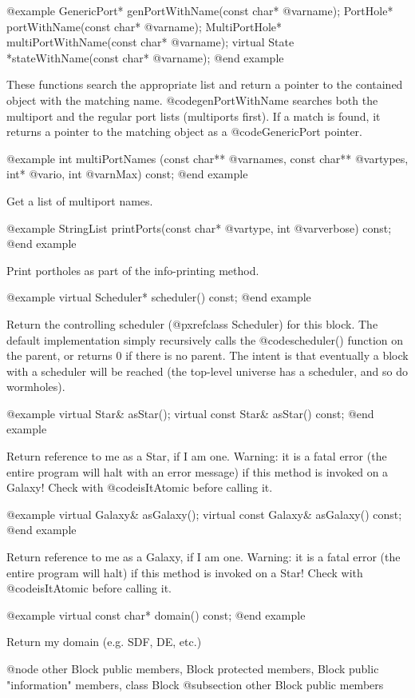 @example
GenericPort* genPortWithName(const char* @var{name});
PortHole* portWithName(const char* @var{name});
MultiPortHole* multiPortWithName(const char* @var{name});
virtual State *stateWithName(const char* @var{name});
@end example

These functions search the appropriate list and return a pointer
to the contained object with the matching name.  @code{genPortWithName}
searches both the multiport and the regular port lists (multiports
first).  If a match is found, it returns a pointer to the matching
object as a @code{GenericPort} pointer.

@example
int multiPortNames (const char** @var{names}, const char** @var{types},
                    int* @var{io}, int @var{nMax}) const;
@end example

Get a list of multiport names.

@example
StringList printPorts(const char* @var{type}, int @var{verbose}) const;
@end example

Print portholes as part of the info-printing method.

@example
virtual Scheduler* scheduler() const;
@end example

Return the controlling scheduler (@pxref{class Scheduler})
for this block.  The default
implementation simply recursively calls the @code{scheduler()} function on the parent, or returns 0
if there is no parent.  The intent is that eventually a block with
a scheduler will be reached (the top-level universe has a scheduler,
and so do wormholes).

@example
virtual Star& asStar();
virtual const Star& asStar() const;
@end example

Return reference to me as a Star, if I am one.  Warning: it is a
fatal error (the entire program will halt with an error message)
if this method is invoked on a Galaxy!  Check with @code{isItAtomic}
before calling it.

@example
virtual Galaxy& asGalaxy();
virtual const Galaxy& asGalaxy() const;
@end example

Return reference to me as a Galaxy, if I am one.  Warning: it is a
fatal error (the entire program will halt) if this method is invoked
on a Star!  Check with @code{isItAtomic} before calling it.

@example
virtual const char* domain() const;
@end example

Return my domain (e.g. SDF, DE, etc.)

@node other Block public members, Block protected members, Block public "information" members, class Block
@subsection other Block public members

